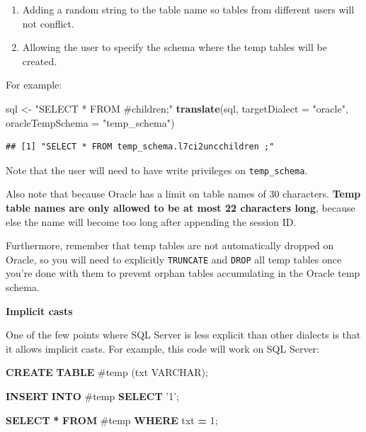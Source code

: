 \documentclass[11pt]{book}
\newenvironment{Shaded}{\begin{snugshade}}{\end{snugshade}}
\newcommand{\DataTypeTok}[1]{\textcolor[rgb]{0.13,0.29,0.53}{#1}}
\newcommand{\DecValTok}[1]{\textcolor[rgb]{0.00,0.00,0.81}{#1}}
\newcommand{\KeywordTok}[1]{\textcolor[rgb]{0.13,0.29,0.53}{\textbf{#1}}}
\newcommand{\NormalTok}[1]{#1}
\newcommand{\OperatorTok}[1]{\textcolor[rgb]{0.81,0.36,0.00}{\textbf{#1}}}
\newcommand{\StringTok}[1]{\textcolor[rgb]{0.31,0.60,0.02}{#1}}
\providecommand{\tightlist}{%
  \setlength{\itemsep}{0pt}\setlength{\parskip}{0pt}}
\theoremstyle{definition}
\theoremstyle{definition}
\theoremstyle{definition}
\theoremstyle{remark}
\begin{document}
\begin{enumerate}
\def\labelenumi{\arabic{enumi}.}
\tightlist
\item
  Adding a random string to the table name so tables from different users will not conflict.
\item
  Allowing the user to specify the schema where the temp tables will be created.
\end{enumerate}

For example:

\begin{Shaded}
\begin{Highlighting}[]
\NormalTok{sql <-}\StringTok{ "SELECT * FROM #children;"}
\KeywordTok{translate}\NormalTok{(sql, }\DataTypeTok{targetDialect =} \StringTok{"oracle"}\NormalTok{, }\DataTypeTok{oracleTempSchema =} \StringTok{"temp_schema"}\NormalTok{)}
\end{Highlighting}
\end{Shaded}

\begin{verbatim}
## [1] "SELECT * FROM temp_schema.l7ci2uncchildren ;"
\end{verbatim}

Note that the user will need to have write privileges on \texttt{temp\_schema}.

Also note that because Oracle has a limit on table names of 30 characters. \textbf{Temp table names are only allowed to be at most 22 characters long}, because else the name will become too long after appending the session ID.

Furthermore, remember that temp tables are not automatically dropped on Oracle, so you will need to explicitly \texttt{TRUNCATE} and \texttt{DROP} all temp tables once you're done with them to prevent orphan tables accumulating in the Oracle temp schema.

\textbf{Implicit casts}

One of the few points where SQL Server is less explicit than other dialects is that it allows implicit casts. For example, this code will work on SQL Server:

\begin{Shaded}
\begin{Highlighting}[]
\KeywordTok{CREATE} \KeywordTok{TABLE}\NormalTok{ #temp (txt }\DataTypeTok{VARCHAR}\NormalTok{);}

\KeywordTok{INSERT} \KeywordTok{INTO}\NormalTok{ #temp}
\KeywordTok{SELECT} \StringTok{'1'}\NormalTok{;}

\KeywordTok{SELECT} \OperatorTok{*} \KeywordTok{FROM}\NormalTok{ #temp }\KeywordTok{WHERE}\NormalTok{ txt }\OperatorTok{=} \DecValTok{1}\NormalTok{;}
\end{Highlighting}
\end{Shaded}
\end{document}
